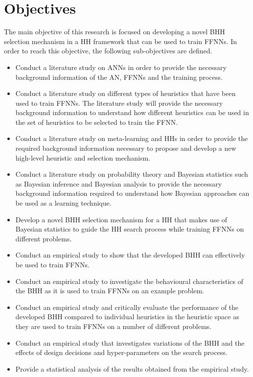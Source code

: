 \section{Objectives}\label{sec:introduction:objectives}

The main objective of this research is focused on developing a novel \Acf{BHH} selection mechanism in a \acs{HH} framework that can be used to train \acp{FFNN}. In order to reach this objective, the following sub-objectives are defined.

\begin{itemize}
      \item Conduct a literature study on \acp{ANN} in order to provide the necessary background information of the \acs{AN}, \acp{FFNN} and the training process.

      \item Conduct a literature study on different types of heuristics that have been used to train \acp{FFNN}. The literature study will provide the necessary background information to understand how different heuristics can be used in the set of heuristics to be selected to train the \acs{FFNN}.

      \item Conduct a literature study on meta-learning and \acp{HH} in order to provide the required background information necessary to propose and develop a new high-level heuristic and selection mechanism.

      \item Conduct a literature study on probability theory and Bayesian statistics such as Bayesian inference and Bayesian analysis to provide the necessary background information required to understand how Bayesian approaches can be used as a learning technique.

      \item Develop a novel \Acs{BHH} selection mechanism for a \acs{HH} that makes use of Bayesian statistics to guide the \acs{HH} search process while training \acp{FFNN} on different problems.

      \item Conduct an empirical study to show that the developed \Acs{BHH} can effectively be used to train \acp{FFNN}.

      \item Conduct an empirical study to investigate the behavioural characteristics of the \Acs{BHH} as it is used to train \acp{FFNN} on an example problem.

      \item Conduct an empirical study and critically evaluate the performance of the developed \Acs{BHH} compared to individual heuristics in the heuristic space as they are used to train \acp{FFNN} on a number of different problems.

      \item Conduct an empirical study that investigates variations of the \Acs{BHH} and the effects of design decisions and hyper-parameters on the search process.

      \item Provide a statistical analysis of the results obtained from the empirical study.
\end{itemize}


